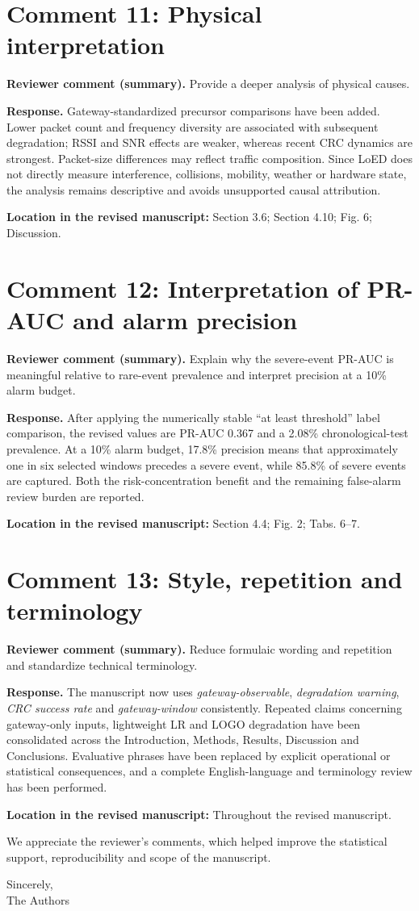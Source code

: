 \documentclass[11pt]{article}
\newcommand{\ReviewerComment}[1]{\par\noindent\textcolor{reviewblue}{\textbf{Reviewer comment (summary).}} #1\par}
\newcommand{\AuthorResponse}[1]{\par\noindent\textcolor{responsegreen}{\textbf{Response.}} #1\par}
\newcommand{\Location}[1]{\par\noindent\textbf{Location in the revised manuscript:} #1\par}
\begin{document}
\section*{Comment 11: Physical interpretation}
\ReviewerComment{Provide a deeper analysis of physical causes.}
\AuthorResponse{Gateway-standardized precursor comparisons have been added. Lower packet count and frequency diversity are associated with subsequent degradation; RSSI and SNR effects are weaker, whereas recent CRC dynamics are strongest. Packet-size differences may reflect traffic composition. Since LoED does not directly measure interference, collisions, mobility, weather or hardware state, the analysis remains descriptive and avoids unsupported causal attribution.}
\Location{Section 3.6; Section 4.10; Fig. 6; Discussion.}

\section*{Comment 12: Interpretation of PR-AUC and alarm precision}
\ReviewerComment{Explain why the severe-event PR-AUC is meaningful relative to rare-event prevalence and interpret precision at a 10\% alarm budget.}
\AuthorResponse{After applying the numerically stable ``at least threshold'' label comparison, the revised values are PR-AUC 0.367 and a 2.08\% chronological-test prevalence. At a 10\% alarm budget, 17.8\% precision means that approximately one in six selected windows precedes a severe event, while 85.8\% of severe events are captured. Both the risk-concentration benefit and the remaining false-alarm review burden are reported.}
\Location{Section 4.4; Fig. 2; Tabs. 6--7.}

\section*{Comment 13: Style, repetition and terminology}
\ReviewerComment{Reduce formulaic wording and repetition and standardize technical terminology.}
\AuthorResponse{The manuscript now uses \emph{gateway-observable}, \emph{degradation warning}, \emph{CRC success rate} and \emph{gateway-window} consistently. Repeated claims concerning gateway-only inputs, lightweight LR and LOGO degradation have been consolidated across the Introduction, Methods, Results, Discussion and Conclusions. Evaluative phrases have been replaced by explicit operational or statistical consequences, and a complete English-language and terminology review has been performed.}
\Location{Throughout the revised manuscript.}

\vspace{8pt}
We appreciate the reviewer's comments, which helped improve the statistical support, reproducibility and scope of the manuscript.

\vspace{10pt}
Sincerely,\\
The Authors
\end{document}
